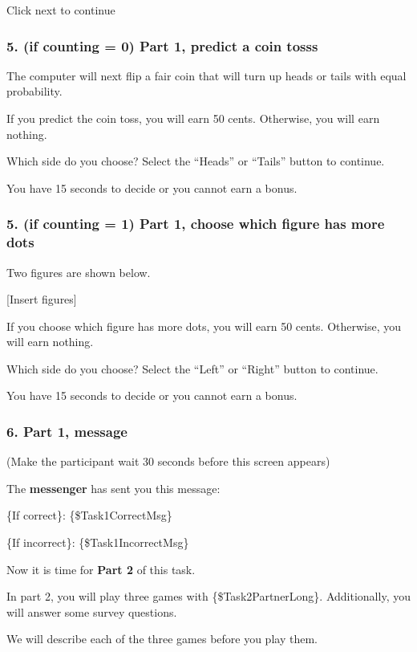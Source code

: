 Click next to continue

\subsubsection*{5. (if counting = 0) Part 1, predict a coin tosss}
The computer will next flip a fair coin that will turn up heads or tails with
equal probability. 

If you predict the coin toss, you will earn 50 cents.
Otherwise, you will earn nothing. 

Which side do you choose? Select the ``Heads''
or ``Tails'' button to continue. 

You have 15 seconds to decide or you cannot
earn a bonus.

\subsubsection*{5. (if counting = 1) Part 1, choose which figure has more dots}

Two figures are shown below. 

[Insert figures] 

If you choose which figure has
more dots, you will earn 50 cents. Otherwise, you will earn nothing. 

Which side
do you choose? Select the ``Left'' or ``Right'' button to continue. 

You have 15
seconds to decide or you cannot earn a bonus.

\subsubsection*{6. Part 1, message}

(Make the participant wait 30 seconds before this screen appears) 

The
\textbf{messenger} has sent you this message: 

\{If correct\}: \{\$Task1CorrectMsg\}

\{If
incorrect\}: \{\$Task1IncorrectMsg\}

\begin{description}[listparindent = 1.5em]
    \item[Part 2 Instructions] \hspace{1cm}
    
    Now it is time for \textbf{Part 2} of this task. 
    
    In part 2, you will play three
    games with \{\$Task2PartnerLong\}. Additionally, you will answer some survey
    questions. 
    
    We will describe each of the three games before you play them.
\end{description}


